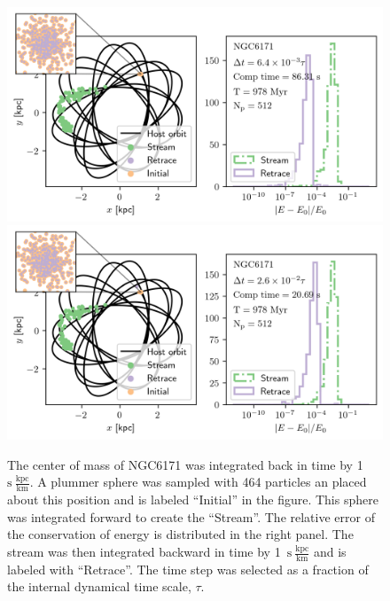         \begin{figure}
            \centering
            \includegraphics[width=\linewidth]{images/NumericalErrorStreamRetrace_NGC6171_Nsteps_524288_stepsPerTau_155.png}
            \includegraphics[width=\linewidth]{images/NumericalErrorStreamRetrace_NGC6171_Nsteps_131072_stepsPerTau_38.png}
            \caption{The center of mass of NGC6171 was integrated back in time by 1~$\mathrm{s}~\frac{\mathrm{kpc}}{\mathrm{km}}$. A plummer sphere was sampled with 464 particles an placed about this position and is labeled ``Initial'' in the figure. This sphere was integrated forward to create the ``Stream''. The relative error of the conservation of energy is distributed in the right panel. The stream was then integrated backward in time by 1~$\mathrm{s}~\frac{\mathrm{kpc}}{\mathrm{km}}$ and is labeled with ``Retrace''. The time step was selected as a fraction of the internal dynamical time scale, $\tau$. }
            \label{fig:NumericalErrorStreamRetrace_NGC6171_Nsteps_1048576_stepsPerTau_311}
        \end{figure}


